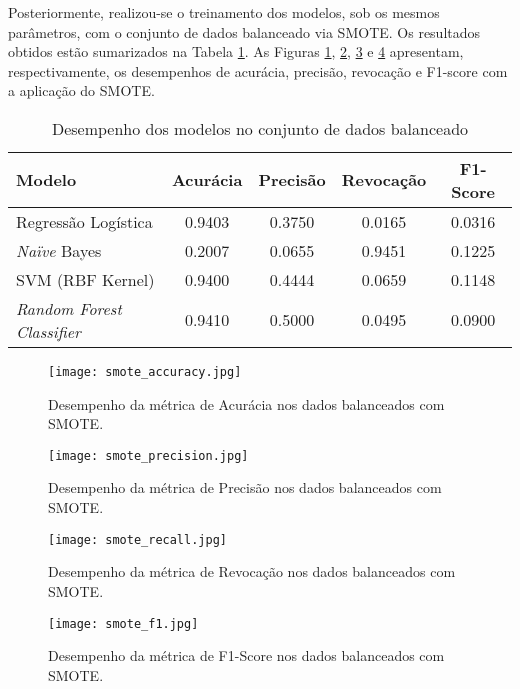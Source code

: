 \documentclass[conference]{IEEEtran}
\begin{document}
Posteriormente, realizou-se o treinamento dos modelos, sob os mesmos parâmetros, com o conjunto de dados balanceado via SMOTE. Os resultados obtidos estão sumarizados na Tabela \ref{tab:resultados_balanceados}. As Figuras \ref{fig:accuracy_smote}, \ref{fig:precision_smote}, \ref{fig:recall_smote} e \ref{fig:f1_smote} apresentam, respectivamente, os desempenhos de acurácia, precisão, revocação e F1-score com a aplicação do SMOTE.

\begin{table}[h]
    \centering
    \caption{Desempenho dos modelos no conjunto de dados balanceado}
    \label{tab:resultados_balanceados}
    \begin{tabular}{lcccc}
    \hline
    Modelo & Acurácia & Precisão & Revocação & F1-Score \\ \hline
    Regressão Logística & 0.9403 & 0.3750 & 0.0165 & 0.0316 \\
    \textit{Naïve} Bayes & 0.2007 & 0.0655 & 0.9451 & 0.1225 \\
    SVM (RBF Kernel) & 0.9400 & 0.4444 & 0.0659 & 0.1148 \\
    \textit{Random Forest Classifier}& 0.9410 & 0.5000 & 0.0495 & 0.0900 \\
    \end{tabular}
\end{table}

\begin{figure}[h]
    \centering
    \texttt{[image: smote\_accuracy.jpg]}\textbf{}
    \caption{Desempenho da métrica de Acurácia nos dados balanceados com SMOTE.}
    \label{fig:accuracy_smote}
\end{figure}

\begin{figure}[h]
    \centering
    \texttt{[image: smote\_precision.jpg]}
    \caption{Desempenho da métrica de Precisão nos dados balanceados com SMOTE.}
    \label{fig:precision_smote}
\end{figure}

\begin{figure}[h]
    \centering
    \texttt{[image: smote\_recall.jpg]}
    \caption{Desempenho da métrica de Revocação nos dados balanceados com SMOTE.}
    \label{fig:recall_smote}
\end{figure}

\begin{figure}[ht]
    \centering
    \texttt{[image: smote\_f1.jpg]}
    \caption{Desempenho da métrica de F1-Score nos dados balanceados com SMOTE.}
    \label{fig:f1_smote}
\end{figure}
\end{document}
